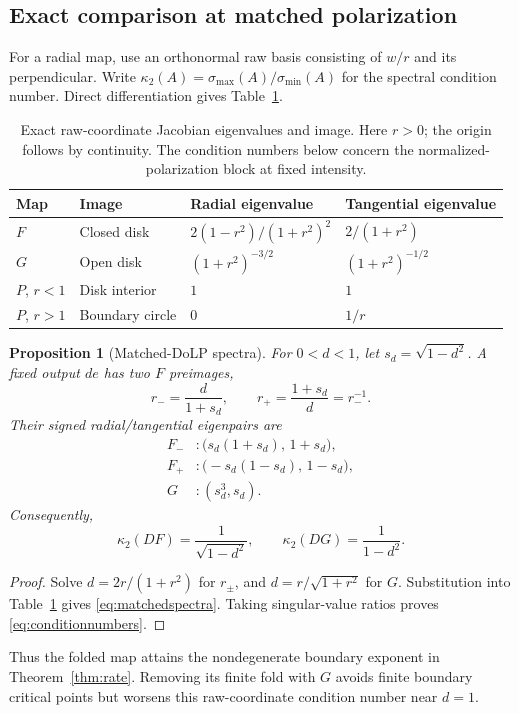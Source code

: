 \documentclass[10pt,a4paper]{article}
\newtheorem{proposition}[theorem]{Proposition}
\begin{document}
\subsection{Exact comparison at matched polarization}
For a radial map, use an orthonormal raw basis consisting of $w/r$ and its perpendicular. Write $\kappa_2(A)=\sigma_{\max}(A)/\sigma_{\min}(A)$ for the spectral condition number. Direct differentiation gives Table~\ref{tab:spectra}.
\begin{table}[!t]
\caption{Exact raw-coordinate Jacobian eigenvalues and image. Here $r>0$; the origin follows by continuity. The condition numbers below concern the normalized-polarization block at fixed intensity.}
\label{tab:spectra}
\centering\small\renewcommand{\arraystretch}{1.15}
\begin{tabular}{@{}llll@{}}\toprule
Map & Image & Radial eigenvalue & Tangential eigenvalue\\\midrule
$F$ & Closed disk & $2(1-r^2)/(1+r^2)^2$ & $2/(1+r^2)$\\
$G$ & Open disk & $(1+r^2)^{-3/2}$ & $(1+r^2)^{-1/2}$\\
$P$, $r<1$ & Disk interior & $1$ & $1$\\
$P$, $r>1$ & Boundary circle & $0$ & $1/r$\\\bottomrule
\end{tabular}
\end{table}

\begin{proposition}[Matched-DoLP spectra]
\label{prop:spectra}
For $0<d<1$, let $s_d=\sqrt{1-d^2}$. A fixed output $de$ has two $F$ preimages,
\begin{equation}
 r_-=\frac{d}{1+s_d},\qquad r_+=\frac{1+s_d}{d}=r_-^{-1}.
 \label{eq:inverse}
\end{equation}
Their signed radial/tangential eigenpairs are
\begin{equation}
 \begin{aligned}
 F_- &: \bigl(s_d(1+s_d),\,1+s_d\bigr),\\
 F_+ &: \bigl(-s_d(1-s_d),\,1-s_d\bigr),\\
 G &: (s_d^3,s_d).
 \end{aligned}
 \label{eq:matchedspectra}
\end{equation}
Consequently,
\begin{equation}
 \kappa_2(DF)=\frac1{\sqrt{1-d^2}},\qquad
 \kappa_2(DG)=\frac1{1-d^2}.
 \label{eq:conditionnumbers}
\end{equation}
\end{proposition}
\begin{proof}
Solve $d=2r/(1+r^2)$ for $r_\pm$, and $d=r/\sqrt{1+r^2}$ for $G$. Substitution into Table~\ref{tab:spectra} gives \eqref{eq:matchedspectra}. Taking singular-value ratios proves \eqref{eq:conditionnumbers}.
\end{proof}
Thus the folded map attains the nondegenerate boundary exponent in Theorem~\ref{thm:rate}. Removing its finite fold with $G$ avoids finite boundary critical points but worsens this raw-coordinate condition number near $d=1$.
\end{document}
